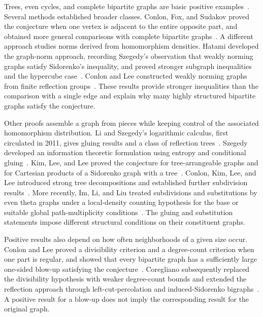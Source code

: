 Trees, even cycles, and complete bipartite graphs are basic positive
examples~\cite{sidorenko1993}. Several methods established broader
classes. Conlon,
Fox, and Sudakov proved the conjecture when one vertex is adjacent to
the entire opposite part, and obtained more general comparisons with
complete bipartite graphs~\cite{conlonfoxsudakov2010}.  A different
approach studies norms derived from homomorphism densities.
Hatami developed the graph-norm approach, recording Szegedy's observation
that weakly norming graphs satisfy Sidorenko's inequality, and proved
stronger subgraph inequalities and the hypercube case~\cite{hatami2010}.
Conlon and Lee constructed weakly norming graphs from finite reflection
groups~\cite{conlonlee2017}.  These results provide stronger inequalities
than the comparison with a single edge and explain why many highly
structured bipartite graphs satisfy the conjecture.

Other proofs assemble a graph from pieces while keeping control of
the associated homomorphism distribution.  Li and Szegedy's logarithmic
calculus, first circulated in 2011, gives gluing results and a class of
reflection trees~\cite{liszegedy2025}.  Szegedy developed an information
theoretic formulation using entropy and conditional
gluing~\cite{szegedy2015entropy}.  Kim, Lee, and Lee proved the conjecture
for tree-arrangeable graphs and for Cartesian products of a Sidorenko
graph with a tree~\cite{kimleelee2016}.  Conlon, Kim, Lee, and Lee
introduced strong tree decompositions and established further
subdivision results~\cite{conlonkimleelee2018}.  More recently, Im,
Li, and Liu treated subdivisions and substitutions by even theta
graphs under a local-density counting hypothesis for the base or suitable
global path-multiplicity conditions~\cite{imliliu2026}.
The gluing and substitution statements impose different structural
conditions on their constituent graphs.

Positive results also depend on how often neighborhoods of a given
size occur. Conlon and Lee proved a divisibility criterion and a
degree-count criterion when one part is regular, and showed that every
bipartite graph has a sufficiently large one-sided blow-up satisfying
the conjecture~\cite{conlonlee2021}. Coregliano subsequently replaced
the divisibility hypothesis with weaker degree-count bounds and
extended the reflection approach through left-cut-percolation and
induced-Sidorenko bigraphs~\cite{coregliano2024}.  A positive result
for a blow-up does not imply the corresponding result for the
original graph.

